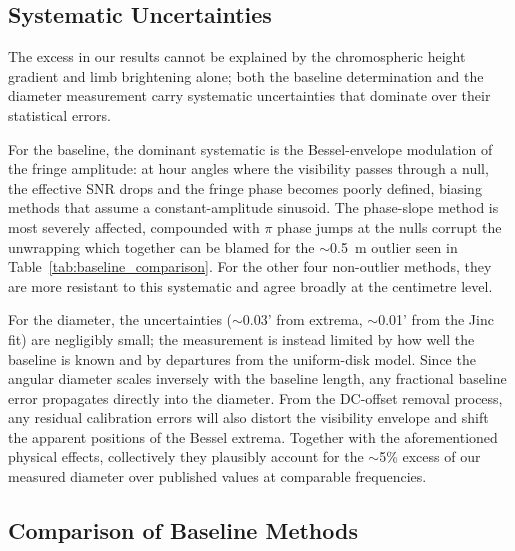 \documentclass[10pt,preprint2]{aastex}
\begin{document}
\subsection{Systematic Uncertainties}
\label{sec:error_budget}

The excess in our results cannot be explained by the chromospheric height gradient and limb brightening alone; both the baseline determination and the diameter measurement carry systematic uncertainties that dominate over their statistical errors.

For the baseline, the dominant systematic is the Bessel-envelope modulation of the fringe amplitude: at hour angles where the visibility passes through a null, the effective SNR drops and the fringe phase becomes poorly defined, biasing methods that assume a constant-amplitude sinusoid. The phase-slope method is most severely affected, compounded with $\pi$ phase jumps at the nulls corrupt the unwrapping which together can be blamed for the $\sim$0.5~m outlier seen in Table~\ref{tab:baseline_comparison}. For the other four non-outlier methods, they are more resistant to this systematic and agree broadly at the centimetre level.

For the diameter, the uncertainties ($\sim$0.03' from extrema, $\sim$0.01' from the Jinc fit) are negligibly small; the measurement is instead limited by how well the baseline is known and by departures from the uniform-disk model. Since the angular diameter scales inversely with the baseline length, any fractional baseline error propagates directly into the diameter. From the DC-offset removal process, any residual calibration errors will also distort the visibility envelope and shift the apparent positions of the Bessel extrema. Together with the aforementioned physical effects, collectively they plausibly account for the $\sim$5\% excess of our measured diameter over published values at comparable frequencies.

\subsection{Comparison of Baseline Methods}
\label{sec:baseline_discussion}
\end{document}
